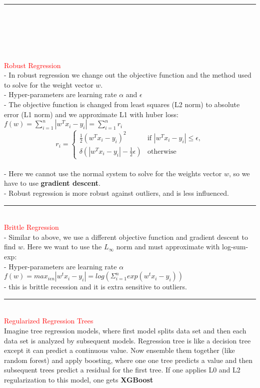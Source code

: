 \documentclass[8pt]{extarticle}
\begin{document}
\begin{multicols*}{2}
\\
\rule{\linewidth}{0.5mm} 
\\\\\\\\\\
\textcolor{red}{Robust Regression}
\\
- In robust regression we change out the objective function and the method used to solve for  the weight vector $w$.
\\
- Hyper-parameters are learning rate $\alpha$ and $\epsilon$
\\
- The objective function is changed from least squares (L2 norm) to absolute error (L1 norm) and we approximate L1 with huber loss:
\\
$f(w) = \sum_{i=1}^{n}|w^Tx_i - y_i| = \sum_{i=1}^{n}r_i$
\\
\[
r_i = 
\begin{cases} 
\frac{1}{2} (w^Tx_i - y_i)^2 & \text{if } |w^Tx_i - y_i| \leq \epsilon, \\
\delta \left( |w^Tx_i - y_i| - \frac{1}{2} \epsilon \right) &
\text{otherwise}
\end{cases}
\]
\\
- Here we cannot use the normal system to solve for the weights vector $w$, so we have to use \textbf{gradient descent}.
\\
- Robust regression is more robust against outliers, and is less influenced. 
\\
\rule{\linewidth}{0.5mm}
\\
\textcolor{red}{Brittle Regression}
\\
- Similar to above, we use a different objective function and gradient descent to find $w$. Here we want to use the $L_{\infty}$ norm and must approximate with log-sum-exp:
\\
- Hyper-parameters are learning rate $\alpha$
\\
$f(w) = max_{i \epsilon n} |w^tx_i - y_i| = log(\Sigma^n_{i=1}exp(w^tx_i - y_i)) $
\\
- this is brittle recession and it is extra sensitive to outliers.
\\
\rule{\linewidth}{0.5mm} 
\\
\textcolor{red}{Regularized Regression Trees}
\\
Imagine tree regression models, where first model splits data set and then each data set is analyzed by subsequent models. Regression tree is like a decision tree except it can predict a continuous value. Now ensemble them together (like random forest) and apply boosting, where one one tree predicts a value and then subsequent trees predict a residual for the first tree. If one applies L0 and L2 regularization to this model, one gets \textbf{XGBoost}

\end{multicols*}
\end{document}
